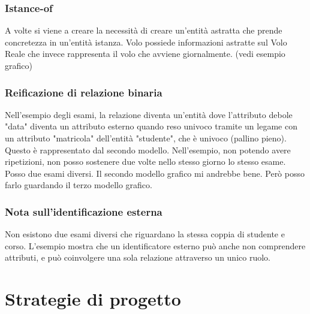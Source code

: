 \subsubsection{Istance-of}
A volte si viene a creare la necessità di creare un'entità astratta che prende concretezza in un'entità istanza. Volo possiede informazioni astratte sul Volo Reale che invece rappresenta il volo che avviene giornalmente. (vedi esempio grafico)

\subsubsection{Reificazione di relazione binaria}
Nell'esempio degli esami, la relazione diventa un'entità dove l'attributo debole "data" diventa un attributo esterno quando reso univoco tramite un legame con un attributo "matricola" dell'entità "studente", che è univoco (pallino pieno). Questo è rappresentato dal secondo modello. Nell'esempio, non potendo avere ripetizioni, non posso sostenere due volte nello stesso giorno lo stesso esame. Posso due esami diversi. Il secondo modello grafico mi andrebbe bene. Però posso farlo guardando il terzo modello grafico.

\subsubsection{Nota sull'identificazione esterna}
Non esistono due esami diversi che riguardano la stessa coppia di studente e corso.
L'esempio mostra che un identificatore esterno può anche non comprendere attributi, e può coinvolgere una sola relazione attraverso un unico ruolo.

\section{Strategie di progetto}